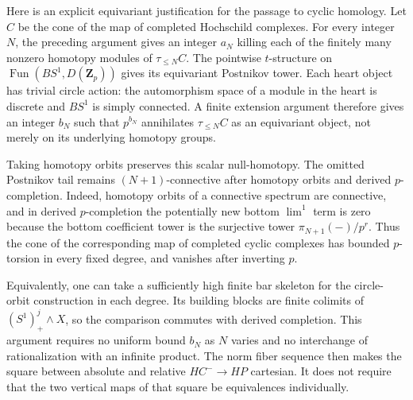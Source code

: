 
Here is an explicit equivariant justification for the passage to cyclic
homology. Let $C$ be the cone of the map of completed Hochschild
complexes. For every integer $N$, the preceding argument gives an
integer $a_N$ killing each of the finitely many nonzero homotopy
modules of $\tau_{\leq N}C$. The pointwise $t$-structure on
$\operatorname{Fun}(BS^1,D(\mathbf Z_p))$ gives its equivariant
Postnikov tower. Each heart object has trivial circle action:
the automorphism space of a module in the heart is discrete and
$BS^1$ is simply connected. A finite extension argument therefore
gives an integer $b_N$ such that $p^{b_N}$ annihilates
$\tau_{\leq N}C$ as an equivariant object, not merely on its
underlying homotopy groups.

Taking homotopy orbits preserves this scalar null-homotopy.
The omitted Postnikov tail remains $(N+1)$-connective after
homotopy orbits and derived $p$-completion. Indeed, homotopy
orbits of a connective spectrum are connective, and in derived
$p$-completion the potentially new bottom $\lim^1$ term is zero
because the bottom coefficient tower is the surjective tower
$\pi_{N+1}(-)/p^r$. Thus the cone of the corresponding map of
completed cyclic complexes has bounded $p$-torsion in every fixed
degree, and vanishes after inverting $p$.

Equivalently, one can take a sufficiently high finite bar skeleton
for the circle-orbit construction in each degree. Its building blocks
are finite colimits of $(S^1)^j_+\wedge X$, so the comparison commutes
with derived completion. This argument requires no uniform bound
$b_N$ as $N$ varies and no interchange of rationalization with an
infinite product. The norm fiber sequence then makes the square
between absolute and relative $HC^-\to HP$ cartesian. It does not
require that the two vertical maps of that square be equivalences
individually.

